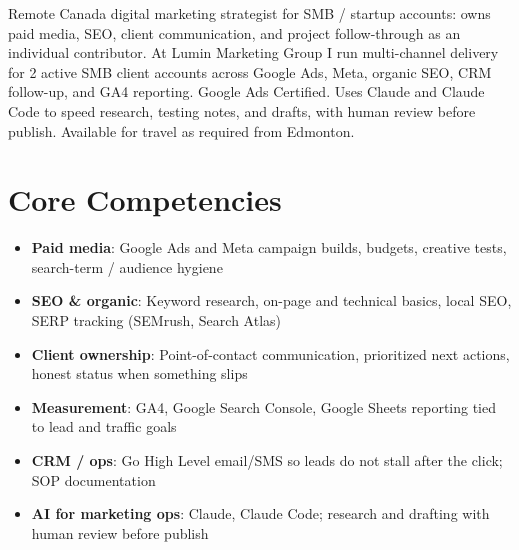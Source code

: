 \documentclass[11pt,a4paper,sans]{moderncv}
\begin{document}
\makecvtitle

\vspace{6pt}
\small{Remote Canada digital marketing strategist for SMB / startup accounts: owns paid media, SEO, client communication, and project follow-through as an individual contributor. At Lumin Marketing Group I run multi-channel delivery for 2 active SMB client accounts across Google Ads, Meta, organic SEO, CRM follow-up, and GA4 reporting. Google Ads Certified. Uses Claude and Claude Code to speed research, testing notes, and drafts, with human review before publish. Available for travel as required from Edmonton.}

\section{Core Competencies}
\vspace{1pt}
\begin{itemize}
\item \textbf{Paid media}: Google Ads and Meta campaign builds, budgets, creative tests, search-term / audience hygiene
\item \textbf{SEO \& organic}: Keyword research, on-page and technical basics, local SEO, SERP tracking (SEMrush, Search Atlas)
\item \textbf{Client ownership}: Point-of-contact communication, prioritized next actions, honest status when something slips
\item \textbf{Measurement}: GA4, Google Search Console, Google Sheets reporting tied to lead and traffic goals
\item \textbf{CRM / ops}: Go High Level email/SMS so leads do not stall after the click; SOP documentation
\item \textbf{AI for marketing ops}: Claude, Claude Code; research and drafting with human review before publish
\end{itemize}
\end{document}
